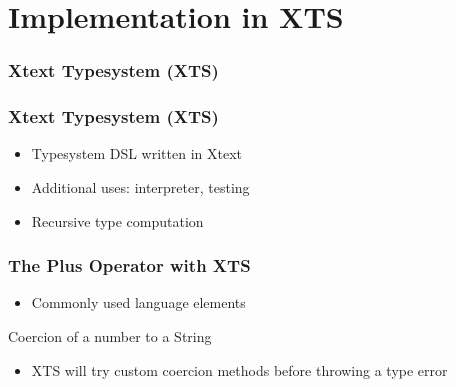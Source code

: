 \section[XTS]{Implementation in XTS}

\begin{frame}
  \frametitle{Xtext Typesystem (XTS)}
  \tableofcontents[currentsection]
\end{frame}

\begin{frame}
  \frametitle{Xtext Typesystem (XTS)}
  \begin{itemize}
  \item Typesystem DSL written in Xtext
  \item Additional uses: interpreter, testing
  \item Recursive type computation
\end{itemize}
\end{frame}

\begin{frame}
  \frametitle{The Plus Operator with XTS}

  \begin{itemize}
    \item Commonly used language elements 
  \end{itemize}

  \begin{footnotesize}
    
  \end{footnotesize}

  
\framebreak
  Coercion of a number to a String
  \begin{itemize}
    \item XTS will try custom coercion methods before throwing a type error 
  \end{itemize}

  \begin{footnotesize}
    
  \end{footnotesize}
	
\end{frame}